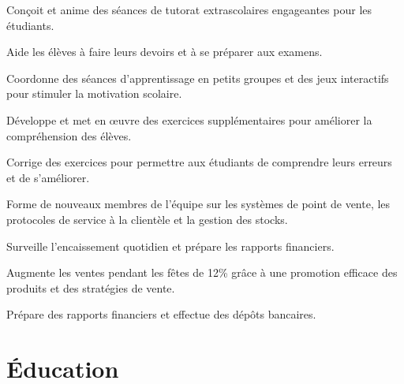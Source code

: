 \documentclass[letterpaper,10pt]{article}
\begin{document}
  \begin{resume_list}
    \item Conçoit et anime des séances de tutorat extrascolaires engageantes pour les étudiants.
    \item Aide les élèves à faire leurs devoirs et à se préparer aux examens.
    \item Coordonne des séances d'apprentissage en petits groupes et des jeux interactifs pour stimuler la motivation scolaire.
    \item Développe et met en œuvre des exercices supplémentaires pour améliorer la compréhension des élèves.
    \item Corrige des exercices pour permettre aux étudiants de comprendre leurs erreurs et de s'améliorer.
  \end{resume_list}

  \begin{resume_list}
    \item Forme de nouveaux membres de l'équipe sur les systèmes de point de vente, les protocoles de service à la clientèle et la gestion des stocks.
    \item Surveille l'encaissement quotidien et prépare les rapports financiers.
    \item Augmente les ventes pendant les fêtes de 12\% grâce à une promotion efficace des produits et des stratégies de vente.
    \item Prépare des rapports financiers et effectue des dépôts bancaires.
  \end{resume_list}


  \section{Éducation}

  \vspace{10pt}
  
\end{document}
